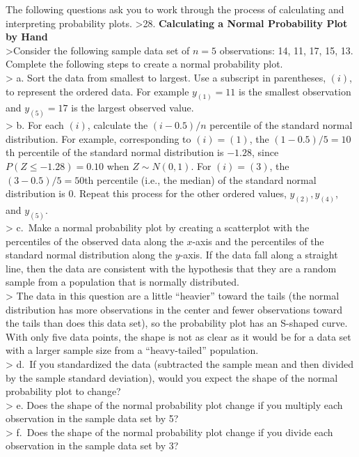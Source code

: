 \documentclass[
]{report}
\begin{document}
The following questions ask you to work through the process of calculating and interpreting probability plots.
\textgreater28. \textbf{Calculating a Normal Probability Plot by Hand}\\
\textgreater Consider the following sample data set of \(n = 5\) observations: 14, 11, 17, 15, 13. Complete the following steps to create a normal probability plot.\\
\textgreater{} a. Sort the data from smallest to largest. Use a subscript in parentheses, \((i)\), to represent the ordered data. For example \(y_{(1)} = 11\) is the smallest observation and \(y_{(5)} = 17\) is the largest observed value.\\
\textgreater{} b. For each \((i)\), calculate the \((i - 0.5)/n\) percentile of the standard normal distribution. For example, corresponding to \((i) = (1)\), the \((1 - 0.5)/5 = 10\)th percentile of the standard normal distribution is \(-1.28\), since \(P(Z \leq -1.28) = 0.10\) when \(Z \sim N(0, 1)\). For \((i) = (3)\), the \((3 - 0.5)/5 = 50\)th percentile (i.e., the median) of the standard normal distribution is \(0\). Repeat this process for the other ordered values, \(y_{(2)}, y_{(4)}\), and \(y_{(5)}\).\\
\textgreater{} c.~Make a normal probability plot by creating a scatterplot with the percentiles of the observed data along the \(x\)-axis and the percentiles of the standard normal distribution along the \(y\)-axis. If the data fall along a straight line, then the data are consistent with the hypothesis that they are a random sample from a population that is normally distributed.\\
\textgreater{} The data in this question are a little ``heavier'' toward the tails (the normal distribution has more observations in the center and fewer observations toward the tails than does this data set), so the probability plot has an S-shaped curve. With only five data points, the shape is not as clear as it would be for a data set with a larger sample size from a ``heavy-tailed'' population.\\
\textgreater{} d.~If you standardized the data (subtracted the sample mean and then divided by the sample standard deviation), would you expect the shape of the normal probability plot to change?\\
\textgreater{} e. Does the shape of the normal probability plot change if you multiply each observation in the sample data set by 5?\\
\textgreater{} f.~Does the shape of the normal probability plot change if you divide each observation in the sample data set by 3?\\
\end{document}
